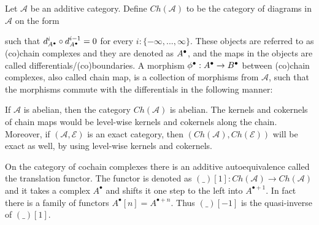     \begin{definition}
        Let $\mathcal{A}$ be an additive category. Define $Ch(\mathcal{A})$ to be the category of diagrams in $\mathcal{A}$ on the form
        \begin{center}
        \end{center}
        such that $d^i_{A^{\bullet}}\circ d^{i-1}_{A^{\bullet}}=0$ for every $i:\{-\infty,...,\infty\}$. These objects are referred to as (co)chain complexes and they are denoted as $A^{\bullet}$, and the maps in the objects are called differentials/(co)boundaries. A morphism $\phi^{\bullet} : A^{\bullet}\rightarrow B^{\bullet}$ between (co)chain complexes, also called chain map, is a collection of morphisms from $\mathcal{A}$, such that the morphisms commute with the differentials in the following manner:
        \begin{center}
        \end{center}
    \end{definition}

    \begin{remark}
        If $\mathcal{A}$ is abelian, then the category $Ch(\mathcal{A})$ is abelian. The kernels and cokernels of chain maps would be level-wise kernels and cokernels along the chain. Moreover, if $(\mathcal{A},\mathcal{E})$ is an exact category, then $(Ch(\mathcal{A}),Ch(\mathcal{E}))$ will be exact as well, by using level-wise kernels and cokernels.
    \end{remark}

    \begin{remark}
        On the category of cochain complexes there is an additive autoequivalence called the translation functor. The functor is denoted as $(\_)[1]:Ch(\mathcal{A})\rightarrow Ch(\mathcal{A})$ and it takes a complex $A^{\bullet}$ and shifts it one step to the left into $A^{\bullet + 1}$. In fact there is a family of functors $A^{\bullet}[n]=A^{\bullet + n}$. Thus $(\_)[-1]$ is the quasi-inverse of $(\_)[1]$.
    \end{remark}

